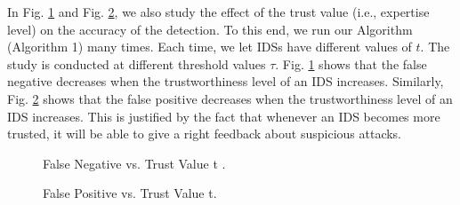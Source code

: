 \documentclass[conference]{IEEEtran}
\begin{document}
In Fig. \ref{fig4} and Fig. \ref{fig5}, we also study the effect of the trust value (i.e., expertise level) on the accuracy of the detection. To this end, we run our Algorithm (Algorithm 1) many times. Each time, we let IDSs have different values of $t$. The study is conducted at different threshold values $\tau$. Fig. \ref{fig4} shows that the false negative decreases when the trustworthiness level of an IDS increases. Similarly, Fig. \ref{fig5} shows that the false positive decreases when the trustworthiness level of an IDS increases. This is justified by the fact that whenever an IDS becomes more trusted, it will be able to give a right feedback about suspicious attacks.

\begin{figure}[htbp]

\centering
{}
\caption{False Negative vs. Trust Value t .}
\label{fig4}
\end{figure}

\begin{figure}[htbp]

\centering
{}
\caption{False Positive vs. Trust Value t.}
\label{fig5}
\end{figure}
\end{document}
